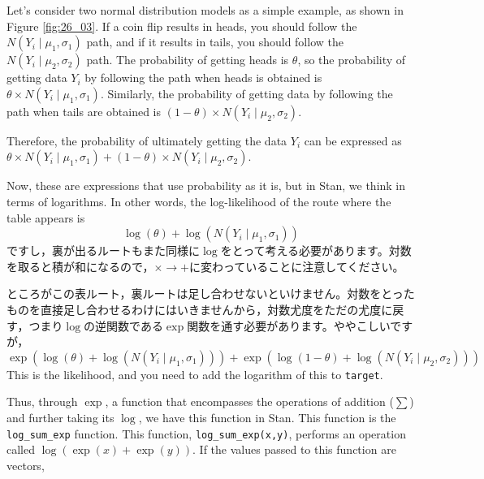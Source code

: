 \documentclass{ltjsbook}
\begin{document}
	Let's consider two normal distribution models as a simple example, as shown in Figure \ref{fig:26_03}. If a coin flip results in heads, you should follow the $N(Y_i\mid\mu_1,\sigma_1)$ path, and if it results in tails, you should follow the $N(Y_i\mid\mu_2,\sigma_2)$ path. The probability of getting heads is $\theta$, so the probability of getting data $Y_i$ by following the path when heads is obtained is $\theta \times N(Y_i\mid\mu_1,\sigma_1)$. Similarly, the probability of getting data by following the path when tails are obtained is $(1-\theta)\times N(Y_i\mid\mu_2,\sigma_2)$.


	Therefore, the probability of ultimately getting the data $Y_i$ can be expressed as $\theta \times N(Y_i \mid \mu_1,\sigma_1) + (1-\theta) \times N(Y_i\mid\mu_2,\sigma_2)$.

	Now, these are expressions that use probability as it is, but in Stan, we think in terms of logarithms. In other words, the log-likelihood of the route where the table appears is
	\[ \log(\theta) + \log(N(Y_i\mid\mu_1,\sigma_1)) \]
	ですし，裏が出るルートもまた同様に$\log$をとって考える必要があります。対数を取ると積が和になるので，$\times \to +$に変わっていることに注意してください。

	ところがこの表ルート，裏ルートは足し合わせないといけません。対数をとったものを直接足し合わせるわけにはいきませんから，対数尤度をただの尤度に戻す，つまり$\log$の逆関数である$\exp$関数を通す必要があります。ややこしいですが，
	\[ \exp\left( \log(\theta) + \log(N(Y_i\mid\mu_1,\sigma_1)) \right) + \exp\left( \log(1-\theta) + \log(N(Y_i\mid\mu_2,\sigma_2)) \right) \]
	This is the likelihood, and you need to add the logarithm of this to \verb|target|.

	Thus, through $\exp$, a function that encompasses the operations of addition ($\sum$) and further taking its $\log$, we have this function in Stan. This function is the \verb|log_sum_exp| function.
	This function, \verb|log_sum_exp(x,y)|, performs an operation called $\log(\exp(x)+\exp(y))$. If the values passed to this function are vectors,
\end{document}
